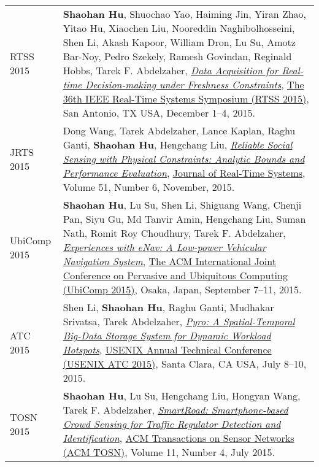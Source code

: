 \begin{longtabu}{p{.51\sectionwidth} p{.78\resumewidth}}
{\sc RTSS 2015}\hypertarget{hu2015rtss}{} &
\textbf{Shaohan Hu}, Shuochao Yao, Haiming Jin, Yiran Zhao, Yitao Hu, Xiaochen Liu, Nooreddin Naghibolhosseini, Shen Li, Akash Kapoor, William Dron, Lu Su, Amotz Bar-Noy, Pedro Szekely, Ramesh Govindan, Reginald Hobbs, Tarek F. Abdelzaher,
\href{http://ieeexplore.ieee.org/document/7383576}{\emph{Data Acquisition for Real-time Decision-making under Freshness Constraints}},
\href{http://2015.rtss.org/}{\textsf{The 36th IEEE Real-Time Systems Symposium (RTSS 2015)}},
San Antonio, TX USA, December 1--4, 2015. \\

{\sc JRTS 2015}\hypertarget{wang2015jrts}{} &
Dong Wang, Tarek Abdelzaher, Lance Kaplan, Raghu Ganti, \textbf{Shaohan Hu}, Hengchang Liu,
\href{https://link.springer.com/article/10.1007/s11241-015-9238-8}{\emph{Reliable Social Sensing with Physical Constraints: Analytic Bounds and Performance Evaluation}},
\href{http://link.springer.com/journal/11241}{\textsf{Journal of Real-Time Systems}},
Volume 51, Number 6, November, 2015. \\

{\sc UbiComp 2015}\hypertarget{hu2015ubicomp}{} &
\textbf{Shaohan Hu}, Lu Su, Shen Li, Shiguang Wang, Chenji Pan, Siyu Gu, Md Tanvir Amin, Hengchang Liu, Suman Nath, Romit Roy Choudhury, Tarek F. Abdelzaher,
\href{http://dl.acm.org/citation.cfm?id=2804287}{\emph{Experiences with eNav: A Low-power Vehicular Navigation System}},
\href{http://ubicomp.org/ubicomp2015/}{\textsf{The ACM International Joint Conference on Pervasive and Ubiquitous Computing (UbiComp 2015)}},
Osaka, Japan, September 7--11, 2015. \\

{\sc ATC 2015}\hypertarget{li2015atc}{} &
Shen Li, \textbf{Shaohan Hu}, Raghu Ganti, Mudhakar Srivatsa, Tarek Abdelzaher,
\href{https://www.usenix.org/system/files/conference/atc15/atc15-paper-li-shen.pdf}{\emph{Pyro: A Spatial-Temporal Big-Data Storage System for Dynamic Workload Hotspots}},
\href{https://www.usenix.org/conference/atc15}{\textsf{USENIX Annual Technical Conference (USENIX ATC 2015)}},
Santa Clara, CA USA, July 8--10, 2015. \\

{\sc TOSN 2015}\hypertarget{hu2015tosn}{} &
\textbf{Shaohan Hu}, Lu Su, Hengchang Liu, Hongyan Wang, Tarek F. Abdelzaher,
\href{http://dl.acm.org/citation.cfm?id=2770876}{\emph{SmartRoad: Smartphone-based Crowd Sensing for Traffic Regulator Detection and Identification}},
\href{http://tosn.acm.org/}{\textsf{ACM Transactions on Sensor Networks (ACM TOSN)}},
Volume 11, Number 4, July 2015. \\


\end{longtabu}
